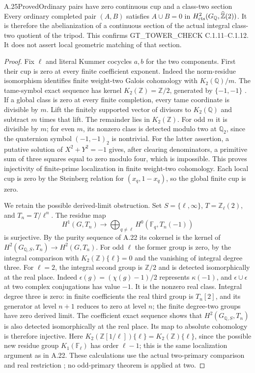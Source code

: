 \begin{result}{A.25}{Proved}{Ordinary pairs have zero continuous cup and a class-two section}
\label{coh:cup}
Every ordinary completed pair $(A,B)$ satisfies
$A\cup B=0$ in
$H^2_{\rm cts}(G_{\mathbb Q},\widehat{\mathbb Z}(2))$.
It is therefore the abelianization of a continuous section of the actual
integral class-two quotient of the tripod. This confirms
GT\_TOWER\_CHECK C.1.11--C.1.12. It does not assert local geometric
matching of that section.
\end{result}
\begin{proof}
Fix $\ell$ and literal Kummer cocycles $a,b$ for the two components.
First their cup is zero at every finite coefficient exponent. Indeed
the norm-residue isomorphism identifies finite weight-two Galois
cohomology with $K_2(\mathbb Q)/m$. The tame-symbol exact sequence
has kernel $K_2(\mathbb Z)=\mathbb Z/2$, generated by $\{-1,-1\}$
\cite[III.5.2.2, III.6.5.1, III.6.10.3--6.10.4]{CohWeibelKbook}.
If a global class is zero at every finite completion, every tame
coordinate is divisible by $m$. Lift the finitely supported vector of
divisors to $K_2(\mathbb Q)$ and subtract $m$ times that lift.
The remainder lies in $K_2(\mathbb Z)$. For odd $m$ it is divisible
by $m$; for even $m$, its nonzero class is detected modulo two at
$\mathbb Q_2$, since the quaternion symbol $(-1,-1)_2$ is nontrivial.
For the latter assertion, a putative solution of $X^2+Y^2=-1$ gives,
after clearing denominators, a primitive sum of three squares equal to
zero modulo four, which is impossible. This proves injectivity of
finite-prime localization in finite weight-two cohomology. Each local
cup is zero by the Steinberg relation for $(x_q,1-x_q)$, so the global
finite cup is zero.

We retain the possible derived-limit obstruction. Set
$S=\{\ell,\infty\}$, $T=\mathbb Z_\ell(2)$, and $T_n=T/\ell^n$.
The residue map
\[
 H^1(G,T_n)\longrightarrow
       \bigoplus_{q\ne\ell}H^0(\mathbb F_q,T_n(-1))
\]
is surjective. By the purity sequence of A.22 its cokernel is the
kernel of $H^2(G_{\mathbb Q,S},T_n)\to H^2(G,T_n)$.
For odd $\ell$ the former group is zero, by the integral comparison
with $K_2(\mathbb Z)\{\ell\}=0$ and the vanishing of integral
degree three. For $\ell=2$, the integral second group is
$\mathbb Z/2$ and is detected isomorphically at the real place.
Indeed $\epsilon(g)=(\chi(g)-1)/2$ represents $\kappa(-1)$, and
$\epsilon\cup\epsilon$ at two complex conjugations has value $-1$.
It is the nonzero real class. Integral degree three is zero: in finite
coefficients the real third group is $T_n[2]$, and its generator at
level $n+1$ reduces to zero at level $n$; the finite degree-two groups
have zero derived limit. The coefficient exact sequence shows that
$H^2(G_{\mathbb Q,S},T_n)$ is also detected isomorphically at the
real place. Its map to absolute cohomology is therefore injective.
Here $K_2(\mathbb Z[1/\ell])\{\ell\}=K_2(\mathbb Z)\{\ell\}$,
since the possible new residue group $K_1(\mathbb F_\ell)$ has
order $\ell-1$; this is the same localization argument as in A.22.
These calculations use the actual two-primary comparison
\cite[VI.9.11, case $n=2$]{CohWeibelKbook} and real restriction
\cite[I.4.10(c)]{CohMilneADT}; no odd-primary theorem is applied at two.


\end{proof}
